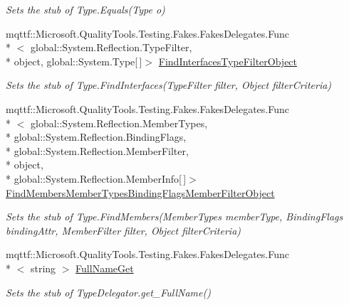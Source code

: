 \begin{DoxyCompactItemize}
\begin{DoxyCompactList}\small\item\em Sets the stub of Type.\-Equals(\-Type o)\end{DoxyCompactList}\item 
mqttf\-::\-Microsoft.\-Quality\-Tools.\-Testing.\-Fakes.\-Fakes\-Delegates.\-Func\\*
$<$ global\-::\-System.\-Reflection.\-Type\-Filter, \\*
object, global\-::\-System.\-Type\mbox{[}$\,$\mbox{]}$>$ \hyperlink{class_system_1_1_reflection_1_1_fakes_1_1_stub_type_delegator_a88bd6bf16864701725134b69f85b23fa}{Find\-Interfaces\-Type\-Filter\-Object}
\begin{DoxyCompactList}\small\item\em Sets the stub of Type.\-Find\-Interfaces(\-Type\-Filter filter, Object filter\-Criteria)\end{DoxyCompactList}\item 
mqttf\-::\-Microsoft.\-Quality\-Tools.\-Testing.\-Fakes.\-Fakes\-Delegates.\-Func\\*
$<$ global\-::\-System.\-Reflection.\-Member\-Types, \\*
global\-::\-System.\-Reflection.\-Binding\-Flags, \\*
global\-::\-System.\-Reflection.\-Member\-Filter, \\*
object, \\*
global\-::\-System.\-Reflection.\-Member\-Info\mbox{[}$\,$\mbox{]}$>$ \hyperlink{class_system_1_1_reflection_1_1_fakes_1_1_stub_type_delegator_a74b417d03402e2240f6f64fb76f55508}{Find\-Members\-Member\-Types\-Binding\-Flags\-Member\-Filter\-Object}
\begin{DoxyCompactList}\small\item\em Sets the stub of Type.\-Find\-Members(\-Member\-Types member\-Type, Binding\-Flags binding\-Attr, Member\-Filter filter, Object filter\-Criteria)\end{DoxyCompactList}\item 
mqttf\-::\-Microsoft.\-Quality\-Tools.\-Testing.\-Fakes.\-Fakes\-Delegates.\-Func\\*
$<$ string $>$ \hyperlink{class_system_1_1_reflection_1_1_fakes_1_1_stub_type_delegator_afaf282989415c99f09caea9e31cb2a70}{Full\-Name\-Get}
\begin{DoxyCompactList}\small\item\em Sets the stub of Type\-Delegator.\-get\-\_\-\-Full\-Name()\end{DoxyCompactList}\item 

\end{DoxyCompactItemize}

